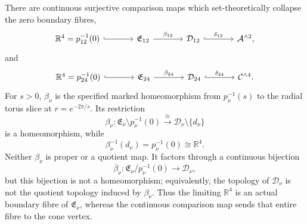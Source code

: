 \begin{theorem}
There are continuous surjective comparison maps which set-theoretically
collapse the zero boundary fibres,
\[
 \begin{tikzcd}[column sep=large]
 \mathbb R^4=p_{12}^{-1}(0)
 \arrow[r,hook]&
 \mathfrak E_{12}
 \arrow[r,"\beta_{12}"]&
 \mathcal D_{12}
 \arrow[r,hook,"\delta_{12}"]&
 \mathcal A^{\wedge2},
 \end{tikzcd}
\]
and
\[
 \begin{tikzcd}[column sep=large]
 \mathbb R^4=p_{24}^{-1}(0)
 \arrow[r,hook]&
 \mathfrak E_{24}
 \arrow[r,"\beta_{24}"]&
 \mathcal D_{24}
 \arrow[r,hook,"\delta_{24}"]&
 \mathcal C^{\wedge4}.
 \end{tikzcd}
\]
For \(s>0\), \(\beta_\nu\) is the specified marked homeomorphism from
\(p_\nu^{-1}(s)\) to the radial torus slice at \(r=e^{-2\pi/s}\).  Its
restriction
\[
 \beta_\nu:\mathfrak E_\nu\setminus p_\nu^{-1}(0)
 \xrightarrow{\ \cong\ }\mathcal D_\nu\setminus\{d_\nu\}
\]
is a homeomorphism, while
\[
 \beta_\nu^{-1}(d_\nu)=p_\nu^{-1}(0)\cong\mathbb R^4.
\]
Neither \(\beta_\nu\) is proper or a quotient map.  It factors through a
continuous bijection
\[
 \overline\beta_\nu:
 \mathfrak E_\nu/p_\nu^{-1}(0)\longrightarrow\mathcal D_\nu,
\]
but this bijection is not a homeomorphism; equivalently, the topology of
\(\mathcal D_\nu\) is not the quotient topology induced by \(\beta_\nu\).
Thus the limiting \(\mathbb R^4\) is an actual boundary fibre of
\(\mathfrak E_\nu\), whereas the continuous comparison map sends that entire
fibre to the cone vertex.
\end{theorem}

